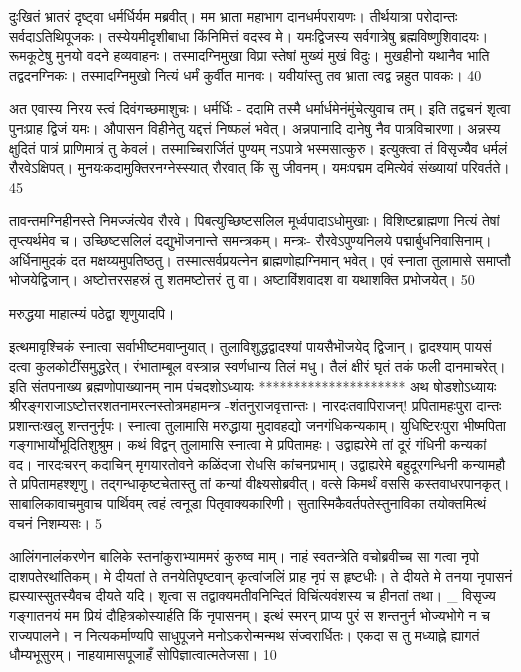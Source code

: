 दुःखितं भ्रातरं दृष्ट्वा धर्मर्धिर्यम मब्रवीत्।
मम भ्राता महाभाग दानधर्मपरायणः।
तीर्थयात्रा परोदान्तः सर्वदाऽतिथिपूजकः।
तस्येयमीदृशीबाधा किंनिमित्तं वदस्व मे।
यमःद्विजस्य सर्वगात्रेषु ब्रह्मविष्णुशिवादयः।
रूमकूटेषु मुनयो वदने हव्यवाहनः।
तस्मादग्निमुखा विप्रा स्तेषां मुख्यं मुखं विदुः।
मुखहीनो यथानैव भाति तद्वदनग्निकः।
तस्मादग्निमुखो नित्यं धर्मं कुर्वीत मानवः।
यवीयांस्तु तव भ्राता त्वद्व न्नहुत पावकः।
40

अत एवास्य निरय स्त्वं दिवंगच्छमाशुचः।
धर्मर्धिः -
ददामि तस्मै धर्मार्धमेनंमुंचेत्युवाच तम्।
इति तद्वचनं शृत्वा पुनःप्राह द्विजं यमः।
औपासन विहीनेतु यद्दत्तं निष्फलं भवेत्।
अन्नपानादि दानेषु नैव पात्रविचारणा।
अन्नस्य क्षुदितं पात्रं प्राणिमात्रं तु केवलं।
तस्माच्चिरार्जितं पुण्यम् नऽपात्रे भस्मसात्कुरु।
इत्युक्त्वा तं विसृज्यैव धर्मलं रौरवेऽक्षिपत्।
मुनयःकदामुक्तिरनग्नेस्स्यात् रौरवात् किं सु जीवनम्।
यमःपद्मम दमित्येवं संख्यायां परिवर्तते।
45

तावन्तमग्निहीनस्ते निमज्जंत्येव रौरवे।
पिबत्युच्छिष्टसलिल मूर्ध्वपादाऽधोमुखाः।
विशिष्टब्राह्मणा नित्यं तेषां तृप्त्यर्थमेव च।
उच्छिष्टसलिलं दद्युभॊजनान्ते समन्त्रकम्।
मन्त्रः- रौरवेऽपुण्यनिलये पद्मार्बुधनिवासिनाम्।
अर्धिनामुदकं दत मक्षय्यमुपतिष्ठतु।
तस्मात्सर्वप्रयत्नेन ब्राह्मणोह्यग्निमान् भवेत्।
एवं स्नाता तुलामासे समाप्तौ भोजयेद्विजान्।
अष्टोत्तरसहस्रं तु शतमष्टोत्तरं तु वा।
अष्टाविंशवादश वा यथाशक्ति प्रभोजयेत्।
50

मरुद्धया माहात्म्यं पठेद्वा शृणुयादपि।

इत्थमावृश्चिकं स्नात्वा सर्वाभीष्टमवाप्नुयात्।
तुलाविशुद्धद्वादश्यां पायसैभॊजयेद् द्विजान्।
द्वादश्याम् पायसं दत्वा कुलकोटींसमुद्धरेत्।
रंभाताम्बूल वस्त्रान्न स्वर्णधान्य तिलं मधु।
तैलं क्षीरं घृतं तकं फली दानमाचरेत्।
इति संतपनाख्य ब्रह्मणोपाख्यानम् नाम
पंचदशोऽध्यायः
*********************
अथ षोडशोऽध्यायः श्रीरङ्गराजाऽष्टोत्तरशतनामरत्नस्तोत्रमहामन्त्र
-शंतनुराजवृत्तान्तः।
नारदःतवापिराजन्! प्रपितामहःपुरा दान्तः
प्रशान्तःखलु शन्तनुर्नृपः।
स्नात्वा तुलामासि मरुद्धाया
मुदावहद्यो जनगंधिकन्यकाम्।
युधिष्टिरःपुरा भीष्मपिता गङ्गाभार्योभूदितिशुश्रुम।
कथं विद्वन् तुलामासि स्नात्वा मे प्रपितामहः।
उद्वाह्यरेमे तां दूरं गंधिनी कन्यकां वद।
नारदःचरन् कदाचिन् मृगयारतोवने
कळिंदजा रोधसि कांचनप्रभाम्।
उद्वाह्यरेमे बहुदूरगन्धिनी
कन्यामहौ ते प्रपितामहश्शृणु।
तद्गन्धाकृष्टचेतास्तु तां कन्यां वीक्ष्यसोब्रवीत्।
वत्से किमर्थं वससि कस्तवाधरपानकृत्।
साबालिकावाचमुवाच पार्थिवम्
त्वहं त्वनूडा पितृवाक्यकारिणी।
सुतास्मिकैवर्तपतेस्तुनाविका
तयोक्तमित्थं वचनं निशम्यसः।
5

आलिंगनालंकरणेन बालिके
स्तनांकुराभ्याममरं कुरुष्व माम्।
नाहं स्वतन्त्रेति वचोब्रवीच्च सा
गत्वा नृपो दाशपतेरथांतिकम्।
मे दीयतां ते तनयेतिपृष्टवान्
कृत्वांजलिं प्राह नृपं स हृष्टधीः।
ते दीयते मे तनया नृपासनं
ह्यस्यास्सुतस्यैवच दीयते यदि।
शृत्वा स तद्वाक्यमतीवनिन्दितं
विचिंत्यवंशस्य च हीनतां तथा।
_ विसृज्य गङ्गातनयं मम प्रियं
दौहित्रकोस्यार्हति किं नृपासनम्।
इत्थं स्मरन् प्राप्य पुरं स शन्तनुर्न
भोज्यभोगे न च राज्यपालने।
न नित्यकर्माण्यपि साधुपूजने मनोऽकरोन्मन्मथ संज्वरार्धितः।
एकदा स तु मध्याह्ने ह्यागतं धौम्यभूसुरम्।
नाहयामासपूजाहँ सोपिज्ञात्वात्मतेजसा।
10

